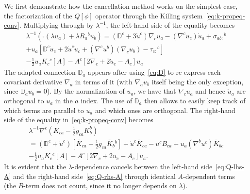 \documentclass[a4paper]{article}
\theoremstyle{remark}
\newcommand{\la}{\lambda}
\newcommand{\D}{\mathbb{D}}
\begin{document}
We first demonstrate how the cancellation method works on the simplest
case, the factorization of the $Q[\phi]$ operator through the Killing
system~\eqref{eq:k-propeq-conv}. Multiplying through by $\la^{-1}$, the
left-hand side of the equality becomes
\begin{multline} \label{eq:Q-lhs-A}
	\la^{-1} (\square (\la u_a) + \la R_a{}^b u_b)
	= (\D^c + 3\dot{u}^c) \nabla_c u_a
		- (\nabla^c u_c) \dot{u}_a + \sigma_{ab:}{}^b
	\\
		+ u_a [\D^c \dot{u}_c + 2\dot{u}^c \dot{u}_c + (\nabla^c u^b) (\nabla_c u_b)
		- \tau_{c:}{}^c]
	\\
		- \frac{1}{2} u_a K_c{}^c[A]
		- A^c [2\nabla_c + 2\dot{u}_c - A_c] u_a
\end{multline}
The adapted connection $\D_a$ appears after using~\eqref{eq:D} to
re-express each covariant derivative $\nabla_a$ in terms of it (with
$\nabla_a u_b$ itself being the only exception, since $\D_a u_b = 0$).
By the normalization of $u_a$, we have that $\nabla_c u_a$ and hence
$\dot{u}_a$ are orthogonal to $u_a$ in the $a$ index. The use of $\D_a$
then allows to easily keep track of which terms are parallel to $u_a$
and which ones are orthogonal.
The right-hand side of the equality in~\eqref{eq:k-propeq-conv} becomes
\begin{multline} \label{eq:Q-rhs-A}
	\la^{-1} \nabla^c (K_{ca} - \tfrac{1}{2} g_{ca} K_b^b)
	\\
	= (\D^c + \dot{u}^c)
		[\bar{K}_{ca} - \tfrac{1}{2} g_{ca} \bar{K}_b{}^b]
		+ \dot{u}^c \bar{K}_{ca}
		- u^c B_{ca}
		+ u_a (\nabla^b u^c) \bar{K}_{bc}
	\\
		- \frac{1}{2} u_{a} K_c{}^c[A]
		- A^c [2\nabla_c + 2 \dot{u}_c - A_c] u_a
	.
\end{multline}
It is evident that the $\la$-dependence cancels between the left-hand
side~\eqref{eq:Q-lhs-A} and the right-hand side~\eqref{eq:Q-rhs-A}
through identical $A$-dependent terms (the $B$-term does not count,
since it no longer depends on $\la$).
\end{document}
